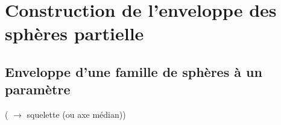 


\section{Construction de l'enveloppe des sphères partielle}%

\subsection{Enveloppe d'une famille de sphères à un paramètre}
 \cite{monge1809, peternell1997} ( $\to$ squelette (ou axe médian))


